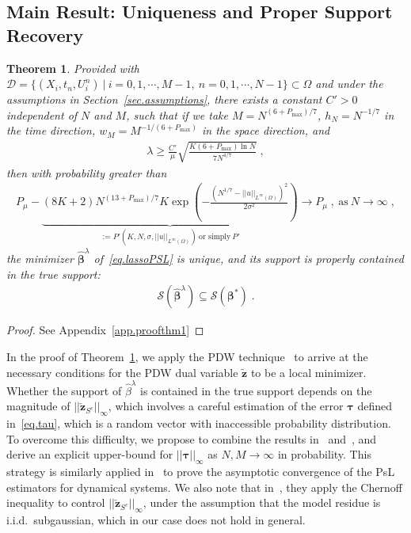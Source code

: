 \documentclass[a4paper,11pt]{article}
\newcommand{\btau}{\bm{\tau}}
\newcommand{\bbeta}{\bm{\beta}}
\newcommand{\mS}{\mathcal{S}}
\newtheorem{thm}{Theorem}[section]
\begin{document}
\subsection{Main Result: Uniqueness and Proper Support Recovery}

\begin{thm}\label{thm1}
Provided with $\mathcal{D}=\{(X_i,t_n,U_i^n)~|~i=0,1,\cdots,M-1,~n=0,1,\cdots,N-1\}\subset\Omega$ and under the assumptions in Section~\ref{sec.assumptions}, there exists a constant $C'>0$ independent of $N$ and $M$, such that if we take $M = N^{(6+P_{\max})/7}$, $h_N=N^{-1/7}$ in the time direction, $w_{M} = M^{-1/(6+P_{\max})}$ in the space direction, and
\begin{align}
\lambda\geq \frac{C'}{\mu}\sqrt{\frac{K(6+P_{\max})\ln N}{7N^{4/7}}}\;,\label{lambdaBound}
\end{align}
then with probability greater than
\begin{align}
	P_\mu-\underbrace{(8K+2)N^{(13+P_{\max})/7}K\exp(-\frac{(N^{1/7}-||u||_{L^\infty(\Omega)})^2}{2\sigma^2})}_{:=P'(K,N,\sigma,||u||_{L^\infty(\Omega)})~\text{or simply}~P'}\longrightarrow P_\mu\;,~\text{as}~N\to\infty\;,\label{eq.probability}
\end{align}
the minimizer $\widehat{\bbeta}^\lambda$ of~\eqref{eq.lassoPSL} is unique, and its support is properly contained in the true support:
\begin{align}
\mS(\widehat{\bbeta}^\lambda)\subseteq\mS(\bbeta^*)\;.
\end{align}	
\end{thm}
\begin{proof}
See Appendix~\ref{app.proofthm1}	
\end{proof}


In the proof of Theorem~\ref{thm1}, we apply the PDW technique~\cite{wainwright2009sharp} to arrive at the necessary conditions for the PDW dual variable $\widetilde{\mathbf{z}}$ to be a local minimizer. Whether the support of $\widehat{\beta}^\lambda$ is contained in the true support depends on the magnitude of $||\check{\mathbf{z}}_{S^c}||_\infty$, which involves a careful estimation of the error $\btau$ defined in~\eqref{eq.tau}, which is a random vector with inaccessible probability distribution.  To overcome this difficulty, we propose to combine the results in~\cite{fan1997local} and~\cite{mack1982weak}, and derive an explicit upper-bound  for $||\btau||_\infty$ as $N,M\to\infty$ in probability. This strategy is similarly applied in~\cite{liang2008parameter} to prove the asymptotic convergence of the PsL estimators for dynamical systems. We also note that in~\cite{wainwright2009sharp}, they apply the Chernoff inequality to control  $||\check{\mathbf{z}}_{S^c}||_\infty$, under the assumption that the model residue is i.i.d.~subgaussian, which in our case does not hold in general. 
\end{document}
